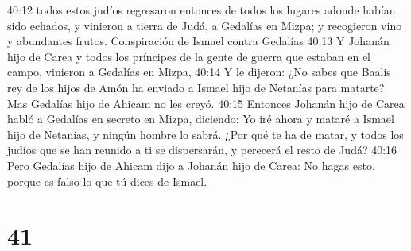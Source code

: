 40:12 todos estos judíos regresaron entonces de todos los lugares adonde habían sido echados, y vinieron a tierra de Judá, a Gedalías en Mizpa; y recogieron vino y abundantes frutos.  
Conspiración de Ismael contra Gedalías  
40:13 Y Johanán hijo de Carea y todos los príncipes de la gente de guerra que estaban en el campo, vinieron a Gedalías en Mizpa,  
40:14 Y le dijeron: ¿No sabes que Baalis rey de los hijos de Amón ha enviado a Ismael hijo de Netanías para matarte? Mas Gedalías hijo de Ahicam no les creyó.  
40:15 Entonces Johanán hijo de Carea habló a Gedalías en secreto en Mizpa, diciendo: Yo iré ahora y mataré a Ismael hijo de Netanías, y ningún hombre lo sabrá. ¿Por qué te ha de matar, y todos los judíos que se han reunido a ti se dispersarán, y perecerá el resto de Judá?  
40:16 Pero Gedalías hijo de Ahicam dijo a Johanán hijo de Carea: No hagas esto, porque es falso lo que tú dices de Ismael.  

\chapter{41}


